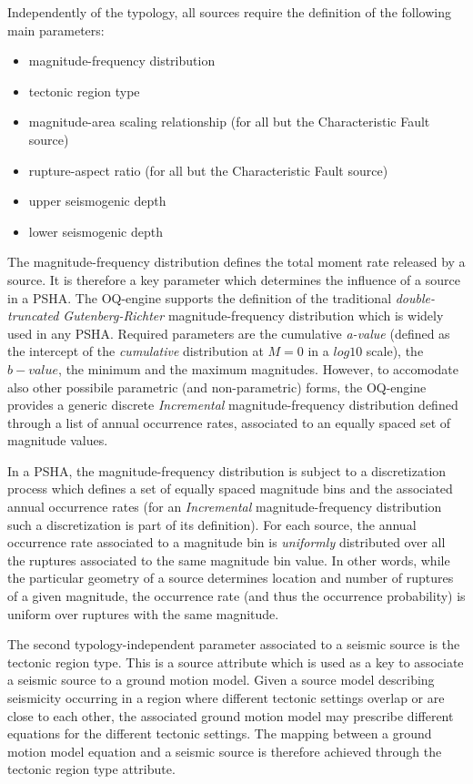 Independently of the typology, all sources require the definition of the following main parameters:
\begin{itemize}
\item magnitude-frequency distribution
\item tectonic region type
\item magnitude-area scaling relationship (for all but the Characteristic Fault source)
\item rupture-aspect ratio (for all but the Characteristic Fault source)
\item upper seismogenic depth
\item lower seismogenic depth
\end{itemize}
The magnitude-frequency distribution defines the total moment rate released by a source. It is therefore a
key parameter which determines the influence of a source in a PSHA. The OQ-engine supports the definition
of the traditional \textit{double-truncated Gutenberg-Richter} magnitude-frequency distribution which is
widely used in any PSHA. Required parameters are the cumulative \textit{a-value} (defined as the intercept
of the \textit{cumulative} distribution at $M=0$ in a $log10$ scale), the $b-value$, the minimum and
the maximum magnitudes. However, to accomodate also other possibile parametric (and non-parametric)
forms, the OQ-engine provides a generic discrete \textit{Incremental} magnitude-frequency distribution
defined through a list of annual occurrence rates, associated to an equally spaced set of magnitude values.

In a PSHA, the magnitude-frequency distribution is subject to a discretization process which defines a set
of equally spaced magnitude bins and the associated annual occurrence rates (for an \textit{Incremental}
magnitude-frequency distribution such a discretization is part of its definition). For each source, the annual
occurrence rate associated to a magnitude bin is \textit{uniformly} distributed over all the ruptures associated
to the same magnitude bin value. In other words, while the particular geometry of a source determines
location and number of ruptures of a given magnitude, the occurrence rate (and thus the occurrence
probability) is uniform over ruptures with the same magnitude.

The second typology-independent parameter associated to a seismic source is the tectonic region type.
This is a source attribute which is used as a key to associate a seismic source to a ground motion model.
Given a source model describing seismicity occurring in a region where different tectonic settings overlap or
are close to each other, the associated ground motion model may prescribe different equations for the different
tectonic settings. The mapping between a ground motion model equation and a seismic source is therefore
achieved through the tectonic region type attribute.

